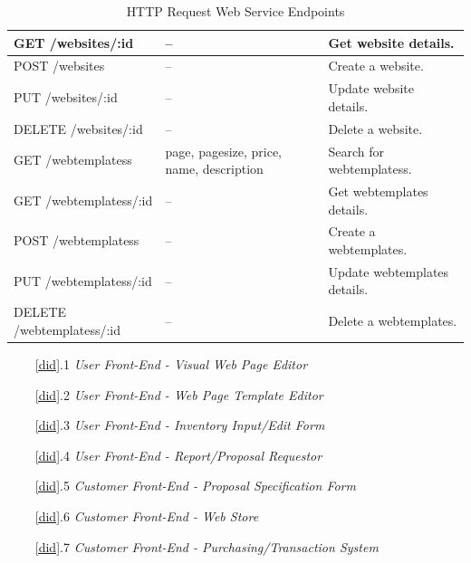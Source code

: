 \documentclass{article}
\newcommand{\br}{\vspace{2mm}}
\begin{document}
\begin{table}[H]
\begin{tabular}{|l|p{4.5cm}|l|}
         GET /websites/:id & -- & Get website details. \\\hline
         POST /websites & -- & Create a website. \\\hline
         PUT /websites/:id & -- & Update website details. \\\hline
         DELETE /websites/:id & -- & Delete a website. \\\hline
         GET /webtemplatess & page, pagesize, price, name, description & Search for webtemplatess. \\\hline
         GET /webtemplatess/:id & -- & Get webtemplates details. \\\hline
         POST /webtemplatess & -- & Create a webtemplates. \\\hline
         PUT /webtemplatess/:id & -- & Update webtemplates details. \\\hline
         DELETE /webtemplatess/:id & -- & Delete a webtemplates. \\\hline
    \end{tabular}
    \caption{HTTP Request Web Service Endpoints}
    \label{endpoints}
\end{table}

\begin{enumerate}
    \item[~\ref{did}.1 ] \emph{User Front-End - Visual Web Page Editor}\br\\
    \item[~\ref{did}.2 ] \emph{User Front-End - Web Page Template Editor}\br\\
    \item[~\ref{did}.3 ] \emph{User Front-End - Inventory Input/Edit Form}\br\\
    \item[~\ref{did}.4 ] \emph{User Front-End - Report/Proposal Requestor}\br\\
    \item[~\ref{did}.5 ] \emph{Customer Front-End - Proposal Specification Form}\br\\
    \item[~\ref{did}.6 ] \emph{Customer Front-End - Web Store}\br\\
    \item[~\ref{did}.7 ] \emph{Customer Front-End - Purchasing/Transaction System}\br\\
\end{enumerate}


\end{document}

